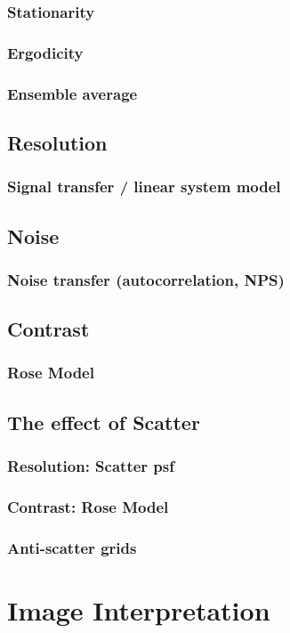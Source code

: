 \documentclass[11pt]{article}
\begin{document}
\subsubsection{Stationarity}
\subsubsection{Ergodicity}
\subsubsection{Ensemble average}
\subsection{Resolution}
\subsubsection{Signal transfer / linear system model}
\subsection{Noise}
\subsubsection{Noise transfer (autocorrelation, NPS)}
\subsection{Contrast}
\subsubsection{Rose Model}
\subsection{The effect of Scatter}
\subsubsection{Resolution: Scatter psf}
\subsubsection{Contrast: Rose Model}
\subsubsection{Anti-scatter grids}

\newpage
\section{Image Interpretation}
\end{document}
